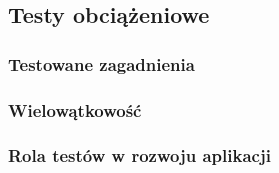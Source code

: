 \subsection{Testy obciążeniowe}

\subsubsection{Testowane zagadnienia}

\subsubsection{Wielowątkowość}


\subsubsection{Rola testów w rozwoju aplikacji}
